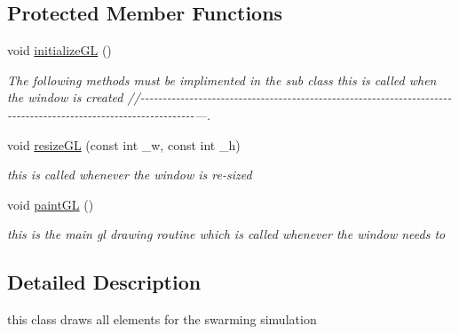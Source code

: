 \subsection*{Protected Member Functions}
\begin{DoxyCompactItemize}
\item 
\hypertarget{classNGLScene_aab2b866db534d286a56cc2240ed98790}{void \hyperlink{classNGLScene_aab2b866db534d286a56cc2240ed98790}{initialize\-G\-L} ()}\label{classNGLScene_aab2b866db534d286a56cc2240ed98790}

\begin{DoxyCompactList}\small\item\em The following methods must be implimented in the sub class this is called when the window is created //-\/-\/-\/-\/-\/-\/-\/-\/-\/-\/-\/-\/-\/-\/-\/-\/-\/-\/-\/-\/-\/-\/-\/-\/-\/-\/-\/-\/-\/-\/-\/-\/-\/-\/-\/-\/-\/-\/-\/-\/-\/-\/-\/-\/-\/-\/-\/-\/-\/-\/-\/-\/-\/-\/-\/-\/-\/-\/-\/-\/-\/-\/-\/-\/-\/-\/-\/-\/-\/-\/-\/-\/-\/-\/-\/-\/-\/-\/-\/-\/-\/-\/-\/-\/-\/-\/-\/-\/-\/-\/-\/-\/-\/-\/-\/-\/-\/-\/-\/-\/-\/-\/-\/-\/-\/-\/-\/-\/-\/-\/-\/-\/---. \end{DoxyCompactList}\item 
void \hyperlink{classNGLScene_ad08cff2eb790203c04862aee6e5432bd}{resize\-G\-L} (const int \-\_\-w, const int \-\_\-h)
\begin{DoxyCompactList}\small\item\em this is called whenever the window is re-\/sized \end{DoxyCompactList}\item 
\hypertarget{classNGLScene_a37bec65bfba7b7a717d803d369221e2d}{void \hyperlink{classNGLScene_a37bec65bfba7b7a717d803d369221e2d}{paint\-G\-L} ()}\label{classNGLScene_a37bec65bfba7b7a717d803d369221e2d}

\begin{DoxyCompactList}\small\item\em this is the main gl drawing routine which is called whenever the window needs to \end{DoxyCompactList}\end{DoxyCompactItemize}


\subsection{Detailed Description}
this class draws all elements for the swarming simulation 

